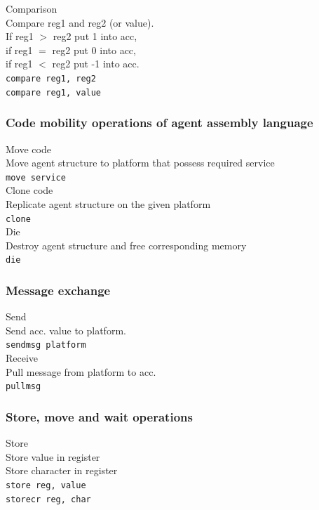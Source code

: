 \documentclass{scrreprt}
\begin{document}
\noindent
Comparison\\
\noindent
Compare reg1 and reg2 (or value).\\ If reg1 $>$ reg2 put 1 into acc,\\ if reg1 $=$ reg2 put 0 into acc,\\ if reg1 $<$ reg2 put -1 into acc.\\
\noindent
\texttt{compare reg1, reg2}\\
\texttt{compare reg1, value}\\


\subsubsection{Code mobility operations of agent assembly language}
\noindent
Move code\\
\noindent
Move agent structure to platform that possess required service\\
\noindent
\texttt{move service}\\


\noindent
Clone code\\
\noindent
Replicate agent structure on the given platform\\
\noindent
\texttt{clone}\\


\noindent
Die\\
\noindent
Destroy agent structure and free corresponding memory\\
\noindent
\texttt{die}\\

\subsubsection{Message exchange}
\noindent
Send\\
\noindent
Send acc. value to platform.\\
\noindent
\texttt{sendmsg platform}\\

\noindent
Receive\\
\noindent
Pull message from platform to acc.\\
\noindent
\texttt{pullmsg}\\

\subsubsection{Store, move and wait operations}
\noindent
Store\\
\noindent
Store value in register\\
Store character in register\\
\noindent
\texttt{store reg, value}\\
\texttt{storecr reg, char}\\
\end{document}
